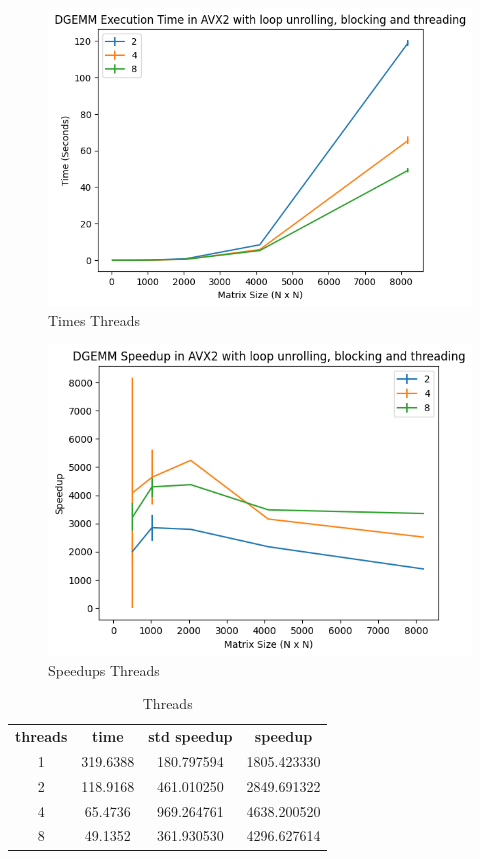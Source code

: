 \documentclass[12pt]{article}
\begin{document}
\begin{figure}[h]
    \centering
    \includegraphics[scale=0.75]{figures/times_threads.png}
    \caption{Times Threads}
    \label{fig:times-threads}
\end{figure}

\begin{figure}[h]
    \centering
    \includegraphics[scale=0.75]{figures/speedups_threads.png}
    \caption{Speedups Threads}
    \label{fig:speedups-threads}
\end{figure}

\begin{table}[h]
    \centering
    \label{tab:threads}
    \begin{tabular}{cccc}
        \textbf{threads} & \textbf{time} & \textbf{std speedup} & \textbf{speedup} \\
        1 & 319.6388 & 180.797594 & 1805.423330 \\
        2 & 118.9168 & 461.010250	& 2849.691322 \\
        4 & 65.4736 & 969.264761	& 4638.200520 \\
        8 & 49.1352	 & 	361.930530	& 4296.627614 \\
    \end{tabular}
    \caption{Threads}
\end{table}
\end{document}
